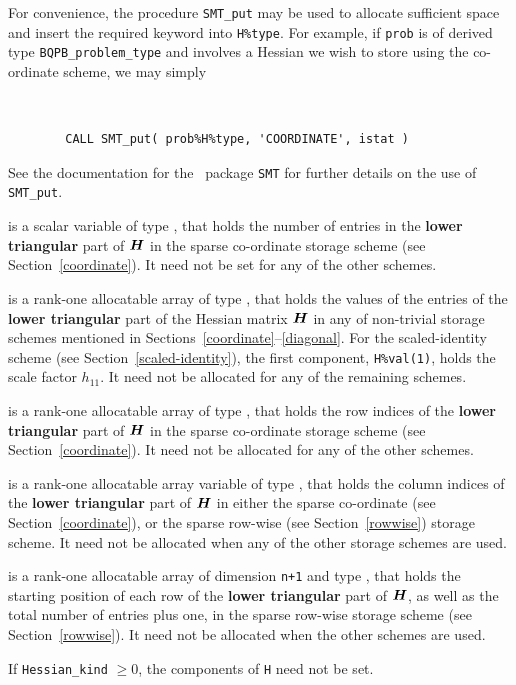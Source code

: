 \documentclass{galahad}
\newcommand{\packagename}{BQPB}
\begin{document}
\begin{description}
\begin{description}
For convenience, the procedure {\tt SMT\_put}
may be used to allocate sufficient space and insert the required keyword
into {\tt H\%type}.
For example, if {\tt prob} is of derived type {\tt \packagename\_problem\_type}
and involves a Hessian we wish to store using the co-ordinate scheme,
we may simply
{\tt
\begin{verbatim}
        CALL SMT_put( prob%H%type, 'COORDINATE', istat )
\end{verbatim}
}
\noindent
See the documentation for the \galahad\ package {\tt SMT}
for further details on the use of {\tt SMT\_put}.

 is a scalar variable of type \integer, that
holds the number of entries in the {\bf lower triangular} part of ${\bm{H}}$
in the sparse co-ordinate storage scheme (see Section~\ref{coordinate}).
It need not be set for any of the other schemes.

 is a rank-one allocatable array of type \realdp, that holds
the values of the entries of the {\bf lower triangular} part
of the Hessian matrix ${\bm{H}}$ in any of non-trivial storage schemes
mentioned in Sections~\ref{coordinate}--\ref{diagonal}.
For the scaled-identity scheme (see Section~\ref{scaled-identity}),
the first component, {\tt H\%val(1)}, holds the scale factor $h_{11}$.
It need not be allocated for any of the remaining schemes.

 is a rank-one allocatable array of type \integer,
that holds the row indices of the {\bf lower triangular} part of ${\bm{H}}$
in the sparse co-ordinate storage scheme (see Section~\ref{coordinate}).
It need not be allocated for any of the other schemes.

 is a rank-one allocatable array variable of type \integer,
that holds the column indices of the {\bf lower triangular} part of
${\bm{H}}$ in either the sparse co-ordinate
(see Section~\ref{coordinate}), or the sparse row-wise
(see Section~\ref{rowwise}) storage scheme.
It need not be allocated when any of the other storage schemes are used.

 is a rank-one allocatable array of dimension {\tt n+1} and type
\integer, that holds the starting position of
each row of the {\bf lower triangular} part of ${\bm{H}}$, as well
as the total number of entries plus one, in the sparse row-wise storage
scheme (see Section~\ref{rowwise}). It need not be allocated when the
other schemes are used.
\end{description}
If {\tt Hessian\_kind} $\geq 0$, the components of {\tt H} need not be set.


\end{description}
\end{document}
